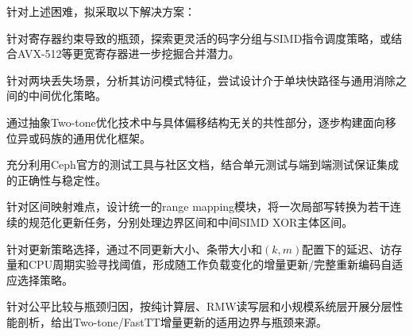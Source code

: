 针对上述困难，拟采取以下解决方案：
\begin{semiQuotList}
    \item 针对寄存器约束导致的瓶颈，探索更灵活的码字分组与SIMD指令调度策略，或结合AVX-512等更宽寄存器进一步挖掘合并潜力。
    \item 针对两块丢失场景，分析其访问模式特征，尝试设计介于单块快路径与通用消除之间的中间优化策略。
    \item 通过抽象Two-tone优化技术中与具体偏移结构无关的共性部分，逐步构建面向移位异或码族的通用优化框架。
    \item 充分利用Ceph官方的测试工具与社区文档，结合单元测试与端到端测试保证集成的正确性与稳定性。
    \item 针对区间映射难点，设计统一的range mapping模块，将一次局部写转换为若干连续的规范化更新任务，分别处理边界区间和中间SIMD XOR主体区间。
    \item 针对更新策略选择，通过不同更新大小、条带大小和$(k,m)$配置下的延迟、访存量和CPU周期实验寻找阈值，形成随工作负载变化的增量更新/完整重新编码自适应选择策略。
    \item 针对公平比较与瓶颈归因，按纯计算层、RMW读写层和小规模系统层开展分层性能剖析，给出Two-tone/FastTT增量更新的适用边界与瓶颈来源。
\end{semiQuotList}
